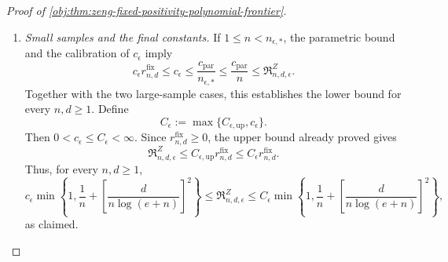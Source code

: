 \documentclass[11pt]{article}
\begin{document}
\begin{proof}[Proof of \cref{obj:thm:zeng-fixed-positivity-polynomial-frontier}]
\begin{enumerate}
\item \textit{Small samples and the final constants.}
If \(1\le n<n_{\epsilon,*}\), the parametric bound and the calibration
of \(c_\epsilon\) imply
\[
c_\epsilon r^{\mathrm{fix}}_{n,d}
\le c_\epsilon
\le\frac{c_{\mathrm{par}}}{n_{\epsilon,*}}
\le\frac{c_{\mathrm{par}}}{n}
\le\mathfrak R^Z_{n,d,\epsilon}.
\]
Together with the two large-sample cases, this establishes the lower
bound for every \(n,d\ge1\). Define
\[
C_\epsilon:=\max\{C_{\epsilon,\mathrm{up}},c_\epsilon\}.
\]
Then \(0<c_\epsilon\le C_\epsilon<\infty\). Since
\(r^{\mathrm{fix}}_{n,d}\ge0\), the upper bound already proved gives
\[
\mathfrak R^Z_{n,d,\epsilon}
\le
C_{\epsilon,\mathrm{up}}r^{\mathrm{fix}}_{n,d}
\le
C_\epsilon r^{\mathrm{fix}}_{n,d}.
\]
Thus, for every \(n,d\ge1\),
\[
c_\epsilon
\min\left\{
1,\frac1n+\left[\frac d{n\log(e+n)}\right]^2
\right\}
\le
\mathfrak R^Z_{n,d,\epsilon}
\le
C_\epsilon
\min\left\{
1,\frac1n+\left[\frac d{n\log(e+n)}\right]^2
\right\},
\]
as claimed.
\end{enumerate}
\end{proof}
\end{document}
